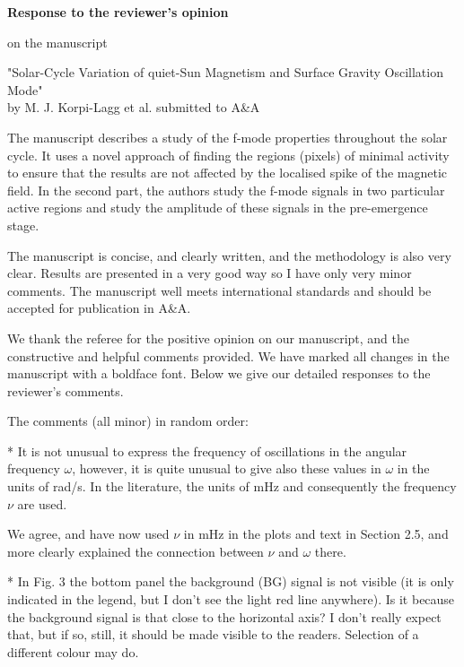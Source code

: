 \documentclass[12pt, letterpaper]{article}
\newcommand{\blue}{\color{blue}}
\begin{document}
\begin{center}

{\bf Response to the reviewer's opinion 

on the manuscript

"Solar-Cycle Variation of quiet-Sun Magnetism and Surface Gravity Oscillation Mode" \\ by M. J. Korpi-Lagg et al. submitted to A\&A}

\end{center}

{\blue The manuscript describes a study of the f-mode properties throughout the solar cycle. It uses a novel approach of finding the regions (pixels) of minimal activity to ensure that the results are not affected by the localised spike of the magnetic field. In the second part, the authors study the f-mode signals in two particular active regions and study the amplitude of these signals in the pre-emergence stage.

The manuscript is concise, and clearly written, and the methodology is also very clear. Results are presented in a very good way so I have only very minor comments. The manuscript well meets international standards and should be accepted for publication in A&A.}

\medskip \noindent We thank the referee for the positive opinion on our manuscript, and the constructive and helpful comments provided. We have marked all changes in the manuscript with a boldface font. Below we give our detailed responses to the reviewer's comments. \medskip

{\blue The comments (all minor) in random order:}

{\blue * It is not unusual to express the frequency of oscillations in the angular frequency $\omega$, however, it is quite unusual to give also these values in $\omega$ in the units of rad/s. In the literature, the units of mHz and consequently the frequency $\nu$ are used.}

\medskip \noindent We agree, and have now used $\nu$ in mHz in the plots and text in Section 2.5, and more clearly explained the connection between $\nu$ and $\omega$ there. \medskip

{\blue * In Fig. 3 the bottom panel the background (BG) signal is not visible (it is only indicated in the legend, but I don't see the light red line anywhere). Is it because the background signal is that close to the horizontal axis? I don't really expect that, but if so, still, it should be made visible to the readers. Selection of a different colour may do.}
\end{document}
